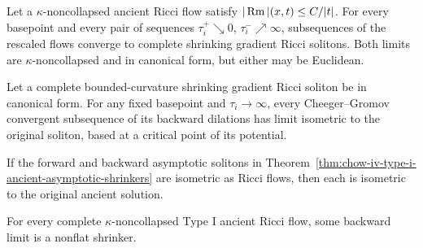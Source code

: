 \begin{theorem}
\label{thm:chow-iv-type-i-ancient-asymptotic-shrinkers}


Let a \(\kappa\)-noncollapsed ancient Ricci flow satisfy
\(|\operatorname{Rm}|(x,t)\leq C/|t|\).  For every basepoint and every pair of sequences
\(\tau_i^+\searrow0\), \(\tau_i^-\nearrow\infty\), subsequences of the
rescaled flows converge to complete shrinking gradient Ricci solitons.  Both
limits are \(\kappa\)-noncollapsed and in canonical form, but either may be
Euclidean.
\end{theorem}

\begin{proposition}
\label{prop:chow-iv-shrinker-backward-limit-isometric}


Let a complete bounded-curvature shrinking gradient Ricci soliton be in
canonical form.  For any fixed basepoint and \(\tau_i\to\infty\), every
Cheeger--Gromov convergent subsequence of its backward dilations has limit
isometric to the original soliton, based at a critical point of its potential.
\end{proposition}

\begin{theorem}
\label{thm:chow-iv-equal-asymptotic-shrinkers-rigidity}


If the forward and backward asymptotic solitons in
Theorem~\ref{thm:chow-iv-type-i-ancient-asymptotic-shrinkers} are isometric
as Ricci flows, then each is isometric to the original ancient solution.
\end{theorem}

\begin{theorem}
\label{thm:chow-iv-type-i-ancient-nonflat-backward-shrinker}

For every complete \(\kappa\)-noncollapsed Type I ancient Ricci flow, some
backward limit is a nonflat shrinker.
\end{theorem}

